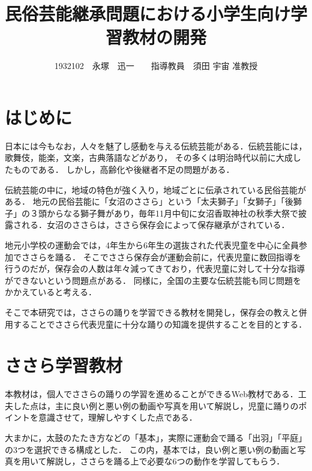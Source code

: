 \documentclass[twocolumn,10pt,a4j]{ltjsarticle}
\title{民俗芸能継承問題における小学生向け学習教材の開発}
\author{1932102　永塚　迅一　　指導教員　須田 宇宙 准教授}
\date{}
\begin{document}
\maketitle
\section{はじめに}

日本には今もなお，人々を魅了し感動を与える伝統芸能がある．伝統芸能には，歌舞伎，能楽，文楽，古典落語などがあり，
その多くは明治時代以前に大成したものである．
しかし，高齢化や後継者不足の問題がある．

伝統芸能の中に，地域の特色が強く入り，地域ごとに伝承されている民俗芸能がある．
地元の民俗芸能に「女沼のささら」という「太夫獅子」「女獅子」「後獅子」の３頭からなる獅子舞があり，毎年11月中旬に女沼香取神社の秋季大祭で披露される\cite{suda2018}．女沼のささらは，ささら保存会によって保存継承がされている．


地元小学校の運動会では，4年生から6年生の選抜された代表児童を中心に全員参加でささらを踊る．
そこでささら保存会が運動会前に，代表児童に数回指導を行うのだが，保存会の人数は年々減ってきており，代表児童に対して十分な指導ができないという問題点がある．
同様に，全国の主要な伝統芸能も同じ問題をかかえていると考える．

そこで本研究では，ささらの踊りを学習できる教材を開発し，保存会の教えと併用することでささら代表児童に十分な踊りの知識を提供することを目的とする．

\section{ささら学習教材}
本教材は，個人でささらの踊りの学習を進めることができるWeb教材である．工夫した点は，主に良い例と悪い例の動画や写真を用いて解説し，児童に踊りのポイントを意識させて，理解しやすくした点である．

大まかに，太鼓のたたき方などの「基本」，実際に運動会で踊る「出羽」「平庭」の3つを選択できる構成とした．
この内，基本では，良い例と悪い例の動画と写真を用いて解説し，ささらを踊る上で必要な6つの動作を学習してもらう．
\end{document}
